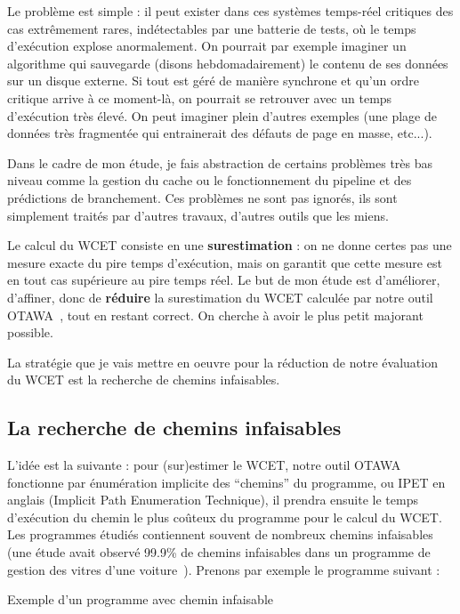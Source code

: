 \documentclass[french]{article}
\begin{document}
  Le problème est simple : il peut exister dans ces systèmes temps-réel critiques des cas extrêmement rares, indétectables par une batterie de tests, où le temps d'exécution explose anormalement. On pourrait par exemple imaginer un algorithme qui sauvegarde (disons hebdomadairement) le contenu de ses données sur un disque externe. Si tout est géré de manière synchrone et qu'un ordre critique arrive à ce moment-là, on pourrait se retrouver avec un temps d'exécution très élevé. On peut imaginer plein d'autres exemples (une plage de données très fragmentée qui entrainerait des défauts de page en masse, etc...).

  Dans le cadre de mon étude, je fais abstraction de certains problèmes très bas niveau comme la gestion du cache ou le fonctionnement du pipeline et des prédictions de branchement. Ces problèmes ne sont pas ignorés, ils sont simplement traités par d'autres travaux, d'autres outils que les miens.

  Le calcul du WCET consiste en une \textbf{surestimation} : on ne donne certes pas une mesure exacte du pire temps d'exécution, mais on garantit que cette mesure est en tout cas supérieure au pire temps réel. Le but de mon étude est d'améliorer, d'affiner, donc de \textbf{réduire} la surestimation du WCET calculée par notre outil OTAWA~\cite{otawa}, tout en restant correct. On cherche à avoir le plus petit majorant possible.

  La stratégie que je vais mettre en oeuvre pour la réduction de notre évaluation du WCET est la recherche de chemins infaisables.

  \subsection{La recherche de chemins infaisables}
  L'idée est la suivante : pour (sur)estimer le WCET, notre outil OTAWA fonctionne par énumération implicite des ``chemins'' du programme, ou IPET en anglais (Implicit Path Enumeration Technique), il prendra ensuite le temps d'exécution du chemin le plus coûteux du programme pour le calcul du WCET. Les programmes étudiés contiennent souvent de nombreux chemins infaisables (une étude avait observé 99.9\% de chemins infaisables dans un programme de gestion des vitres d'une voiture~\cite{wcet05}). Prenons par exemple le programme suivant :

  \begin{algorithm}
    \label{alg:1}
    \caption{Exemple d'un programme avec chemin infaisable}
  \end{algorithm}
\end{document}
